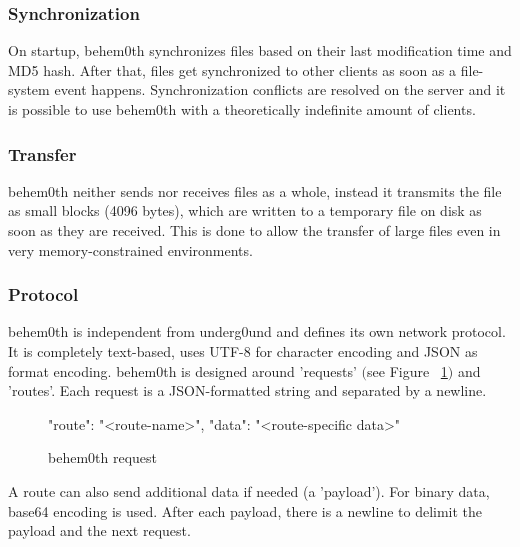 \documentclass[conference]{IEEEtran}
\begin{document}
\subsubsection{Synchronization}
On startup, behem0th\cite{behem0th:Christoph Heiss} synchronizes files based on their last modification time and MD5 hash. After that, files get synchronized to other clients as soon as a file-system event happens. Synchronization conflicts are resolved on the server and it is possible to use behem0th\cite{behem0th:Christoph Heiss} with a theoretically indefinite amount of clients.\\

\subsubsection{Transfer}
behem0th\cite{behem0th:Christoph Heiss} neither sends nor receives files as a whole, instead it transmits the file as small blocks (4096 bytes), which are written to a temporary file on disk as soon as they are received. This is done to allow the transfer of large files even in very memory-constrained environments.\\

\subsubsection{Protocol}
behem0th\cite{behem0th:Christoph Heiss} is independent from underg0und and defines its own network protocol. It is completely text-based, uses UTF-8\cite{UTF-8:F. Yergeau} for character encoding and JSON\cite{JSON:T. Bray Ed.} as format encoding. behem0th\cite{behem0th:Christoph Heiss} is designed around 'requests' $($see Figure ~\ref{fig:behem0th_request}$)$ and 'routes'. Each request is a JSON-formatted string and separated by a newline.

\begin{figure}[H]
\centering
\begin{json}
{
    "route": "<route-name>",
    "data": "<route-specific data>"
}
\end{json}
\caption{behem0th request}
\label{fig:behem0th_request}
\end{figure}

A route can also send additional data if needed (a 'payload'). For binary data, base64\cite{Base64:S. Josefsson} encoding is used. After each payload, there is a newline to delimit the payload and the next request. \\
\end{document}

